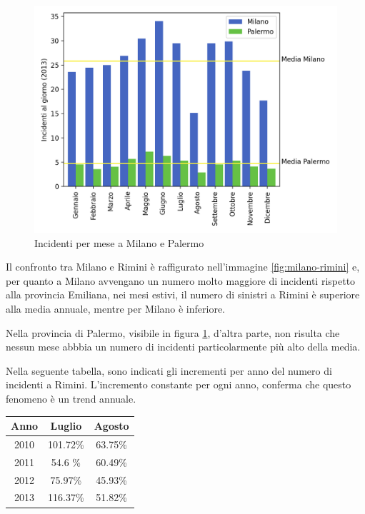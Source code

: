 \documentclass[a4paper]{report}
\begin{document}
\begin{figure}
    \includegraphics[width=\linewidth]{../src/incidenti/incidenti_senza_coords/mese_incidenti/palermo_milano.png}
    \caption{Incidenti per mese a Milano e Palermo}
    \label{fig:palermo-milano}
\end{figure}

Il confronto tra Milano e Rimini è raffigurato nell'immagine \ref{fig:milano-rimini} e, per quanto a 
Milano avvengano un numero molto maggiore di incidenti rispetto alla provincia Emiliana, nei mesi estivi, 
il numero di sinistri a Rimini è superiore alla media annuale, mentre per Milano è inferiore.

Nella provincia di Palermo, visibile in figura \ref{fig:palermo-milano}, d'altra parte, 
non risulta che nessun mese abbbia un numero di incidenti 
particolarmente più alto della media.

Nella seguente tabella, sono indicati gli incrementi per anno del numero di incidenti a Rimini.
L'incremento constante per ogni anno, conferma che questo fenomeno è un trend annuale.

\begin{center}
    \def\arraystretch{1.5}%
    \begin{tabular}{ |c|c|c| } 
    \hline
    Anno & Luglio   & Agosto \\ 
    \hline
    \rowcolor{TableGray}
    2010 & 101.72\% & 63.75\% \\ 
    2011 & 54.6 \%  & 60.49\% \\
    \rowcolor{TableGray}
    2012 & 75.97\%  & 45.93\%\\
    2013 & 116.37\% & 51.82\%\\
    \hline
    \end{tabular}
\end{center}
\end{document}
